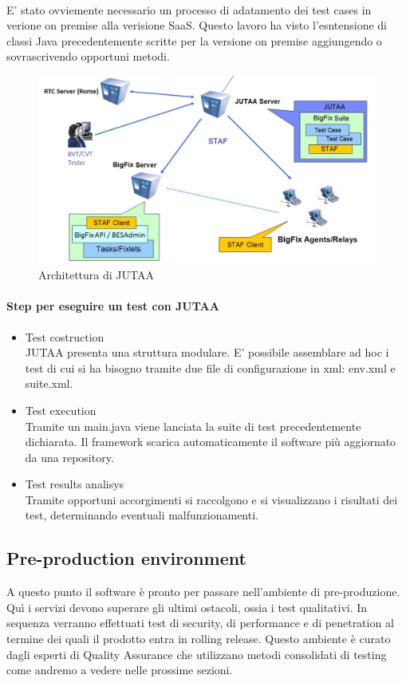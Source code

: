 \paragraph{}
E' stato ovviemente necessario un processo di adatamento dei test cases in verione on premise alla verisione SaaS. Questo lavoro ha visto l'esntensione di classi Java precedentemente scritte per la versione on premise aggiungendo o sovrascrivendo opportuni metodi. 
\begin{figure}[h]
	\centering
	\includegraphics[width=0.7\linewidth]{capitoli/imgs/jutaaarchitecture}
	\caption{Architettura di JUTAA}
	\label{fig:jutaaarchitecture}
\end{figure}
\paragraph{Step per eseguire un test con JUTAA}
\begin{itemize}
	\item Test costruction \\
	JUTAA presenta una struttura modulare. E' possibile assemblare ad hoc i test di cui si ha bisogno tramite due file di configurazione in xml: env.xml e suite.xml. 
	\item Test execution\\
	Tramite un main.java viene lanciata la suite di test precedentemente dichiarata. Il framework scarica automaticamente il software più aggiornato da una repository.
	\item Test results analisys \\
	Tramite opportuni accorgimenti si raccolgono e si visualizzano i risultati dei test, determinando eventuali malfunzionamenti.
\end{itemize}
\subsection{Pre-production environment}
A questo punto il software è pronto per passare nell'ambiente di pre-produzione. Quì i servizi devono superare gli ultimi ostacoli, ossia i test qualitativi. In sequenza verranno effettuati test di security, di performance e di penetration al termine dei quali il prodotto entra in rolling release. Questo ambiente è curato dagli esperti di Quality Assurance che utilizzano metodi consolidati di testing come andremo a vedere nelle prossime sezioni.
